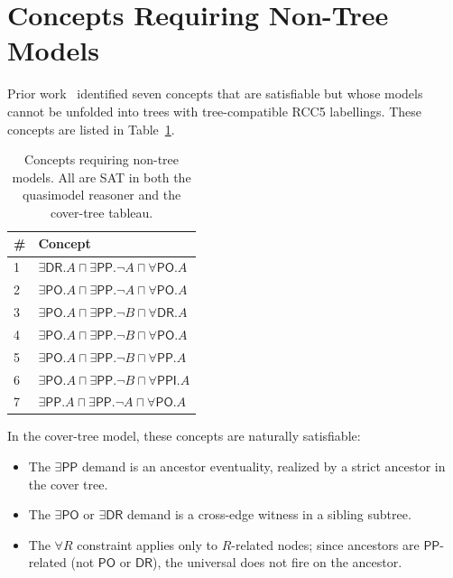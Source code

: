 \documentclass[a4paper,11pt]{article}
\theoremstyle{definition}
\newcommand{\DR}{\ensuremath{\mathsf{DR}}}
\newcommand{\PO}{\ensuremath{\mathsf{PO}}}
\newcommand{\PP}{\ensuremath{\mathsf{PP}}}
\newcommand{\PPI}{\ensuremath{\mathsf{PPI}}}
\begin{document}
\section{Concepts Requiring Non-Tree Models}
\label{sec:cyclic}

Prior work~\cite{ClaudeDecidability} identified seven concepts
that are satisfiable but whose models cannot be unfolded into
trees with tree-compatible RCC5 labellings.
These concepts are listed in Table~\ref{tab:cyclic}.

\begin{table}[ht]
\centering
\caption{Concepts requiring non-tree models.
  All are SAT in both the quasimodel reasoner and the
  cover-tree tableau.}
\label{tab:cyclic}
\renewcommand{\arraystretch}{1.2}
\begin{tabular}{ll}
\toprule
\# & Concept \\
\midrule
1 & $\exists\DR.A \sqcap \exists\PP.\neg A \sqcap \forall\PO.A$ \\
2 & $\exists\PO.A \sqcap \exists\PP.\neg A \sqcap \forall\PO.A$ \\
3 & $\exists\PO.A \sqcap \exists\PP.\neg B \sqcap \forall\DR.A$ \\
4 & $\exists\PO.A \sqcap \exists\PP.\neg B \sqcap \forall\PO.A$ \\
5 & $\exists\PO.A \sqcap \exists\PP.\neg B \sqcap \forall\PP.A$ \\
6 & $\exists\PO.A \sqcap \exists\PP.\neg B \sqcap \forall\PPI.A$ \\
7 & $\exists\PP.A \sqcap \exists\PP.\neg A \sqcap \forall\PO.A$ \\
\bottomrule
\end{tabular}
\end{table}

In the cover-tree model, these concepts are naturally satisfiable:
\begin{itemize}[nosep]
  \item The $\exists\PP$ demand is an ancestor eventuality, realized
    by a strict ancestor in the cover tree.
  \item The $\exists\PO$ or $\exists\DR$ demand is a cross-edge
    witness in a sibling subtree.
  \item The $\forall R$ constraint applies only to $R$-related
    nodes; since ancestors are $\PP$-related (not $\PO$ or $\DR$),
    the universal does not fire on the ancestor.
\end{itemize}
\end{document}
